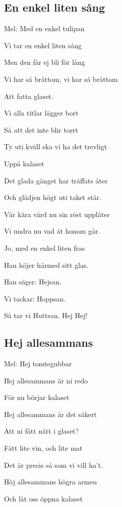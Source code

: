 

\pagestyle{Phörphesten}



\subsection{\textbf{En enkel liten sång}}

Mel: Med en enkel tulipan \bigskip

Vi tar en enkel liten sång

Men den får ej bli för lång

Vi har så bråttom, vi har så bråttom

Att fatta glaset.

Vi alla titlar lägger bort

Så att det inte blir torrt

Ty uti kväll ska vi ha det trevligt

Uppå kalaset\bigskip

Det glada gänget har träffats åter

Och glädjen högt uti taket står.

Vår kära värd nu sin röst upplåter

Vi undra nu vad åt honom går.

Jo, med en enkel liten fras

Han höjer härmed sitt glas.\bigskip

Han säger: Hejsan.

Vi tackar: Hoppsan.

Så tar vi Huttsan. Hej Hej!

\subsection{\textbf{Hej allesammans}}

Mel: Hej tomtegubbar\bigskip

Hej allesammans är ni redo

För nu börjar kalaset

Hej allesammans är det säkert

Att ni fått nått i glaset?

Fått lite vin, och lite mat

Det är precis så som vi vill ha’t.

Höj allesammans högra armen

Och låt oss öppna kalaset

